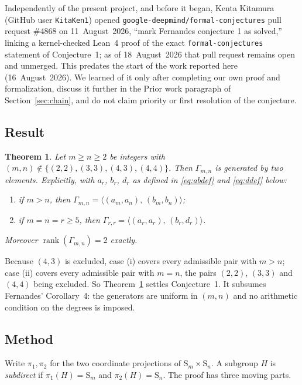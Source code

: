 \documentclass[11pt]{article}
\theoremstyle{plain}
\newtheorem{theorem}{Theorem}[section]
\theoremstyle{definition}
\theoremstyle{remark}
\numberwithin{equation}{section}
\newcommand{\Sym}{\mathrm{S}}
\newcommand{\Gam}{\Gamma}
\DeclareMathOperator{\rank}{rank}
\begin{document}
Independently of the present project, and before it began, Kenta Kitamura (GitHub user
\texttt{KitaKen1}) opened \texttt{google-deepmind/formal-conjectures} pull request \#4868 on
11~August~2026, ``mark Fernandes conjecture 1 as solved,'' linking a kernel-checked Lean~4 proof
of the exact \texttt{formal-conjectures} statement of Conjecture~1; as of 18~August~2026 that pull
request remains open and unmerged. This predates the start of the work reported here
(16~August~2026). We learned of it only after completing our own proof and formalization, discuss
it further in the Prior work paragraph of Section~\ref{sec:chain}, and do not claim priority or
first resolution of the conjecture.

\subsection{Result}

\begin{theorem}
\label{thm:main}
Let $m \ge n \ge 2$ be integers with $(m,n) \notin \{(2,2),(3,3),(4,3),(4,4)\}$. Then
$\Gam_{m,n}$ is generated by two elements. Explicitly, with $a_r$, $b_r$, $d_r$ as defined in
\eqref{eq:abdef} and \eqref{eq:ddef} below:
\begin{enumerate}
\item if $m > n$, then $\Gam_{m,n} = \bigl\langle (a_m,a_n),\,(b_m,b_n) \bigr\rangle$;
\item if $m = n = r \ge 5$, then $\Gam_{r,r} = \bigl\langle (a_r,a_r),\,(b_r,d_r) \bigr\rangle$.
\end{enumerate}
Moreover $\rank(\Gam_{m,n}) = 2$ exactly.
\end{theorem}

Because $(4,3)$ is excluded, case (i) covers every admissible pair with $m > n$; case (ii)
covers every admissible pair with $m = n$, the pairs $(2,2)$, $(3,3)$ and $(4,4)$ being
excluded. So Theorem~\ref{thm:main} settles Conjecture~1. It subsumes Fernandes' Corollary~4:
the generators are uniform in $(m,n)$ and no arithmetic condition on the degrees is imposed.

\subsection{Method}

Write $\pi_1, \pi_2$ for the two coordinate projections of $\Sym_m \times \Sym_n$. A subgroup
$H$ is \emph{subdirect} if $\pi_1(H) = \Sym_m$ and $\pi_2(H) = \Sym_n$. The proof has three
moving parts.
\end{document}
